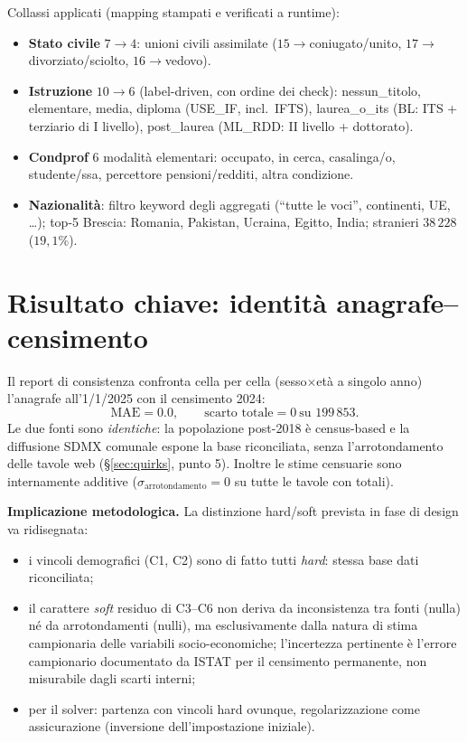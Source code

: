 \documentclass[11pt,a4paper]{article}
\begin{document}
\medskip\noindent Collassi applicati (mapping stampati e verificati a runtime):
\begin{itemize}[leftmargin=*]
  \item \textbf{Stato civile} $7\to4$: unioni civili assimilate
  ($15\to$coniugato/unito, $17\to$divorziato/sciolto, $16\to$vedovo).
  \item \textbf{Istruzione} $10\to6$ (label-driven, con ordine dei check):
  nessun\_titolo, elementare, media, diploma (USE\_IF, incl.\ IFTS),
  laurea\_o\_its (BL: ITS + terziario di I livello), post\_laurea (ML\_RDD:
  II livello + dottorato).
  \item \textbf{Condprof} 6 modalit\`a elementari: occupato, in cerca,
  casalinga/o, studente/ssa, percettore pensioni/redditi, altra condizione.
  \item \textbf{Nazionalit\`a}: filtro keyword degli aggregati (``tutte le
  voci'', continenti, UE, \dots); top-5 Brescia: Romania, Pakistan, Ucraina,
  Egitto, India; stranieri $38\,228$ ($19{,}1\%$).
\end{itemize}

\section{Risultato chiave: identit\`a anagrafe--censimento}
\label{sec:key-result}
Il report di consistenza confronta cella per cella (sesso$\times$et\`a a singolo
anno) l'anagrafe all'1/1/2025 con il censimento 2024:
\[
\text{MAE} = 0.0, \qquad \text{scarto totale} = 0 \ \text{su } 199\,853.
\]
Le due fonti sono \emph{identiche}: la popolazione post-2018 \`e census-based e
la diffusione SDMX comunale espone la base riconciliata, senza l'arrotondamento
delle tavole web (\S\ref{sec:quirks}, punto 5). Inoltre le stime censuarie sono
internamente additive ($\sigma_{\text{arrotondamento}}=0$ su tutte le tavole con
totali).

\medskip\noindent\textbf{Implicazione metodologica.} La distinzione hard/soft
prevista in fase di design va ridisegnata:
\begin{itemize}[leftmargin=*]
  \item i vincoli demografici (C1, C2) sono di fatto tutti \emph{hard}: stessa
  base dati riconciliata;
  \item il carattere \emph{soft} residuo di C3--C6 non deriva da inconsistenza
  tra fonti (nulla) n\'e da arrotondamenti (nulli), ma esclusivamente dalla
  natura di stima campionaria delle variabili socio-economiche; l'incertezza
  pertinente \`e l'errore campionario documentato da ISTAT per il censimento
  permanente, non misurabile dagli scarti interni;
  \item per il solver: partenza con vincoli hard ovunque, regolarizzazione come
  assicurazione (inversione dell'impostazione iniziale).
\end{itemize}
\end{document}
